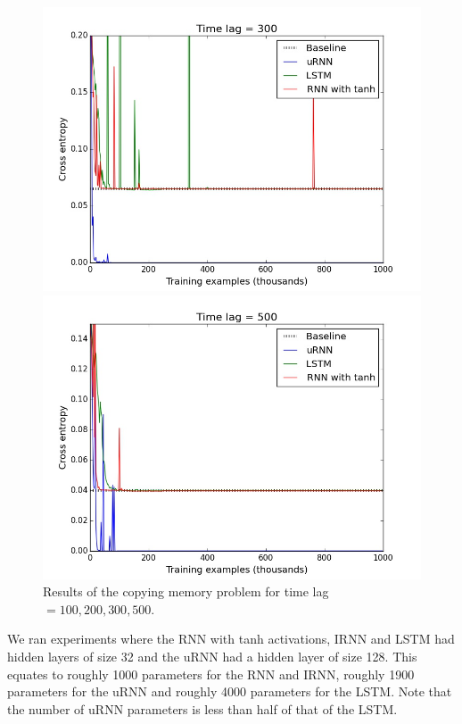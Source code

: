 \documentclass{article} %
\begin{document}
\begin{figure}[t!]
\begin{minipage}[b]{0.5\linewidth}
    \includegraphics[scale=0.25]{figures/memory_300.jpeg}
  \end{minipage}%
  \begin{minipage}[b]{0.5\linewidth}
    \includegraphics[scale=0.25]{figures/memory_500.jpeg}
  \end{minipage} 
  \caption{Results of the copying memory problem for time lag $=100, 200, 300, 500$.}
\end{figure}

We ran experiments where the RNN with tanh activations, IRNN and LSTM had hidden layers of size 32 and the
uRNN had a hidden layer of size 128. This equates to roughly 1000 parameters for the RNN and IRNN, roughly 
1900 parameters for the uRNN and roughly 4000 parameters for the LSTM. Note that the number of uRNN parameters
is less than half of that of the LSTM.
\end{document}

